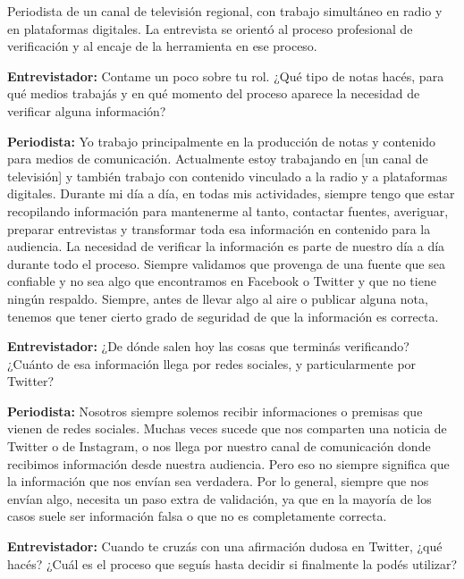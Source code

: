 \label{anexo:entrevista-periodista}

Periodista de un canal de televisión regional, con trabajo simultáneo en radio y en plataformas digitales. La entrevista se orientó al proceso profesional de verificación y al encaje de la herramienta en ese proceso.

\bigskip

\noindent\textbf{Entrevistador:} Contame un poco sobre tu rol. ¿Qué tipo de notas hacés, para qué medios trabajás y en qué momento del proceso aparece la necesidad de verificar alguna información?

\noindent\textbf{Periodista:} Yo trabajo principalmente en la producción de notas y contenido para medios de comunicación. Actualmente estoy trabajando en [un canal de televisión] y también trabajo con contenido vinculado a la radio y a plataformas digitales. Durante mi día a día, en todas mis actividades, siempre tengo que estar recopilando información para mantenerme al tanto, contactar fuentes, averiguar, preparar entrevistas y transformar toda esa información en contenido para la audiencia. La necesidad de verificar la información es parte de nuestro día a día durante todo el proceso. Siempre validamos que provenga de una fuente que sea confiable y no sea algo que encontramos en Facebook o Twitter y que no tiene ningún respaldo. Siempre, antes de llevar algo al aire o publicar alguna nota, tenemos que tener cierto grado de seguridad de que la información es correcta.

\medskip

\noindent\textbf{Entrevistador:} ¿De dónde salen hoy las cosas que terminás verificando? ¿Cuánto de esa información llega por redes sociales, y particularmente por Twitter?

\noindent\textbf{Periodista:} Nosotros siempre solemos recibir informaciones o premisas que vienen de redes sociales. Muchas veces sucede que nos comparten una noticia de Twitter o de Instagram, o nos llega por nuestro canal de comunicación donde recibimos información desde nuestra audiencia. Pero eso no siempre significa que la información que nos envían sea verdadera. Por lo general, siempre que nos envían algo, necesita un paso extra de validación, ya que en la mayoría de los casos suele ser información falsa o que no es completamente correcta.

\medskip

\noindent\textbf{Entrevistador:} Cuando te cruzás con una afirmación dudosa en Twitter, ¿qué hacés? ¿Cuál es el proceso que seguís hasta decidir si finalmente la podés utilizar?

